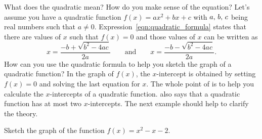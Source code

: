 \documentclass[a4paper,oneside,12pt]{article}
\begin{document}
What does the quadratic  mean?  How do
you make sense of the equation?  Let's assume you have a quadratic
function $f(x) = ax^2 + bx + c$ with ${a},\, {b},\, {c}$ being real
numbers such that $a \neq 0$.
Expression~\eqref{eqn:quadratic_formula} states that there are values
of $x$ such that $f(x) = 0$ and those values of $x$ can be written as
\[
x
=
\frac{
  -b + \sqrt{b^2 - 4ac}
}{
  2a
}
\qquad
\text{and}
\qquad
x
=
\frac{
  -b - \sqrt{b^2 - 4ac}
}{
  2a
}.
\]
How can you use the quadratic formula to help you sketch the graph of
a quadratic function? In the graph of $f(x)$, the $x$-intercept is
obtained by setting $f(x) = 0$ and solving the last equation for $x$.
The whole point of  is to help you
calculate the $x$-intercepts of a quadratic function.
 also says that a quadratic function
has at most two $x$-intercepts.  The next example should help to
clarify the theory.

\begin{example}
Sketch the graph of the function $f(x) = x^2 - x - 2$.
\end{example}
\end{document}
